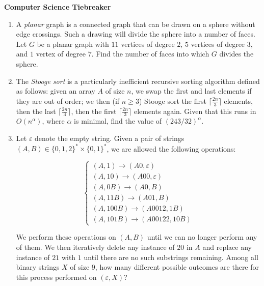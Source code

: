 \documentclass[10pt]{article}
\begin{document}
\newpage

\begin{center}
\huge\textbf{Computer Science Tiebreaker}\normalsize

\vspace{3pt}
\end{center}

\begin{enumerate}

\item A \emph{planar} graph is a connected graph that can be drawn on a sphere without edge crossings. Such a drawing will divide the sphere into a number of faces. Let $G$ be a planar graph with $11$ vertices of degree $2$, $5$ vertices of degree $3$, and $1$ vertex of degree $7$. Find the number of faces into which $G$ divides the sphere.

\item The \emph{Stooge sort} is a particularly inefficient recursive sorting algorithm defined as follows: given an array $A$ of size $n$, we swap the first and last elements if they are out of order; we then (if $n\ge3$) Stooge sort the first $\lceil\frac{2n}3\rceil$ elements, then the last $\lceil\frac{2n}3\rceil$, then the first $\lceil\frac{2n}3\rceil$ elements again. Given that this runs in $O(n^\alpha)$, where $\alpha$ is minimal, find the value of $(243/32)^\alpha$.

\item Let $\varepsilon$ denote the empty string. Given a pair of strings $(A,B)\in\{0,1,2\}^*\times\{0,1\}^*$, we are allowed the following operations:

\[\begin{cases}
(A,1)\to(A0,\varepsilon)\\
(A,10)\to(A00,\varepsilon)\\
(A,0B)\to(A0,B)\\
(A,11B)\to(A01,B)\\
(A,100B)\to(A0012,1B)\\
(A,101B)\to(A00122,10B)
\end{cases}\]

We perform these operations on $(A,B)$ until we can no longer perform any of them. We then iteratively delete any instance of $20$ in $A$ and replace any instance of $21$ with $1$ until there are no such substrings remaining. Among all binary strings $X$ of size $9$, how many different possible outcomes are there for this process performed on $(\varepsilon,X)$?

\end{enumerate}
\end{document}
